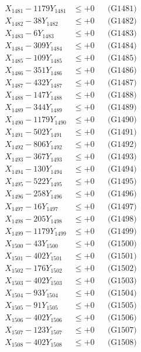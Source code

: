 \documentclass[a4paper,10pt]{article}
\begin{document}
{\begin{align}
\allowbreak
X_{1481} - 1179Y_{1481} &\leq +0 && \text{(G1481)} \\
X_{1482} - 38Y_{1482} &\leq +0 && \text{(G1482)} \\
X_{1483} - 6Y_{1483} &\leq +0 && \text{(G1483)} \\
X_{1484} - 309Y_{1484} &\leq +0 && \text{(G1484)} \\
X_{1485} - 109Y_{1485} &\leq +0 && \text{(G1485)} \\
X_{1486} - 351Y_{1486} &\leq +0 && \text{(G1486)} \\
X_{1487} - 432Y_{1487} &\leq +0 && \text{(G1487)} \\
X_{1488} - 147Y_{1488} &\leq +0 && \text{(G1488)} \\
X_{1489} - 344Y_{1489} &\leq +0 && \text{(G1489)} \\
X_{1490} - 1179Y_{1490} &\leq +0 && \text{(G1490)} \\
\allowbreak
X_{1491} - 502Y_{1491} &\leq +0 && \text{(G1491)} \\
X_{1492} - 806Y_{1492} &\leq +0 && \text{(G1492)} \\
X_{1493} - 367Y_{1493} &\leq +0 && \text{(G1493)} \\
X_{1494} - 130Y_{1494} &\leq +0 && \text{(G1494)} \\
X_{1495} - 522Y_{1495} &\leq +0 && \text{(G1495)} \\
X_{1496} - 258Y_{1496} &\leq +0 && \text{(G1496)} \\
X_{1497} - 16Y_{1497} &\leq +0 && \text{(G1497)} \\
X_{1498} - 205Y_{1498} &\leq +0 && \text{(G1498)} \\
X_{1499} - 1179Y_{1499} &\leq +0 && \text{(G1499)} \\
X_{1500} - 43Y_{1500} &\leq +0 && \text{(G1500)} \\
\allowbreak
X_{1501} - 402Y_{1501} &\leq +0 && \text{(G1501)} \\
X_{1502} - 176Y_{1502} &\leq +0 && \text{(G1502)} \\
X_{1503} - 402Y_{1503} &\leq +0 && \text{(G1503)} \\
X_{1504} - 93Y_{1504} &\leq +0 && \text{(G1504)} \\
X_{1505} - 91Y_{1505} &\leq +0 && \text{(G1505)} \\
X_{1506} - 402Y_{1506} &\leq +0 && \text{(G1506)} \\
X_{1507} - 123Y_{1507} &\leq +0 && \text{(G1507)} \\
X_{1508} - 402Y_{1508} &\leq +0 && \text{(G1508)} \\

\end{align}}
\end{document}
